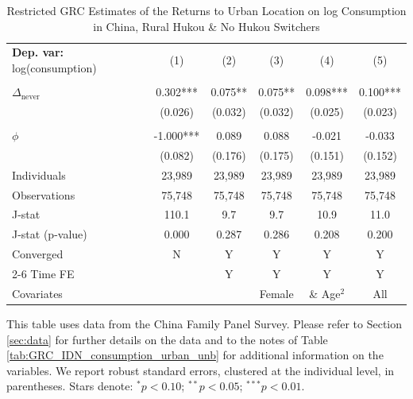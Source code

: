\begin{table}[htbp] \centering \begin{threeparttable}
 \caption{Restricted GRC Estimates of the Returns to Urban Location on log Consumption in China, Rural Hukou & No Hukou Switchers} 
 \label{tab:GRC_CHN_r_same_consumption_urban_unb} 
\begin{tabular}{l ccccc} \toprule  \textbf{Dep. var:}  log(consumption) 
                    &\multicolumn{1}{c}{(1)}   &\multicolumn{1}{c}{(2)}   &\multicolumn{1}{c}{(3)}   &\multicolumn{1}{c}{(4)}   &\multicolumn{1}{c}{(5)}   \\
                    &               &               &               &               &               \\
\addlinespace
$\Delta_{\text{never}}$&       0.302***&       0.075** &       0.075** &       0.098***&       0.100***\\
                    &     (0.026)   &     (0.032)   &     (0.032)   &     (0.025)   &     (0.023)   \\
                    &               &               &               &               &               \\
\addlinespace
$\phi$              &      -1.000***&       0.089   &       0.088   &      -0.021   &      -0.033   \\
                    &     (0.082)   &     (0.176)   &     (0.175)   &     (0.151)   &     (0.152)   \\
\addlinespace
Individuals         &      23,989   &      23,989   &      23,989   &      23,989   &      23,989   \\
Observations        &      75,748   &      75,748   &      75,748   &      75,748   &      75,748   \\
J-stat              &       110.1   &         9.7   &         9.7   &        10.9   &        11.0   \\
J-stat (p-value)    &       0.000   &       0.287   &       0.286   &       0.208   &       0.200   \\
Converged           &           N   &           Y   &           Y   &           Y   &           Y   \\
\cmidrule{2-6} Time FE & & Y & Y & Y & Y \\ Covariates & & & Female & \& Age$^2$ & All \\ \bottomrule \end{tabular} \begin{tablenotes}[flushleft] \footnotesize \item{This table uses data from the China Family Panel Survey. Please refer to Section \ref{sec:data} for further details on the data and to the notes of Table \ref{tab:GRC_IDN_consumption_urban_unb} for additional information on the variables. We report robust standard errors, clustered at the individual level, in parentheses. Stars denote: $^{*} p<0.10$; $^{**} p<0.05$; $^{***} p<0.01$.} \end{tablenotes} \end{threeparttable} \end{table}
